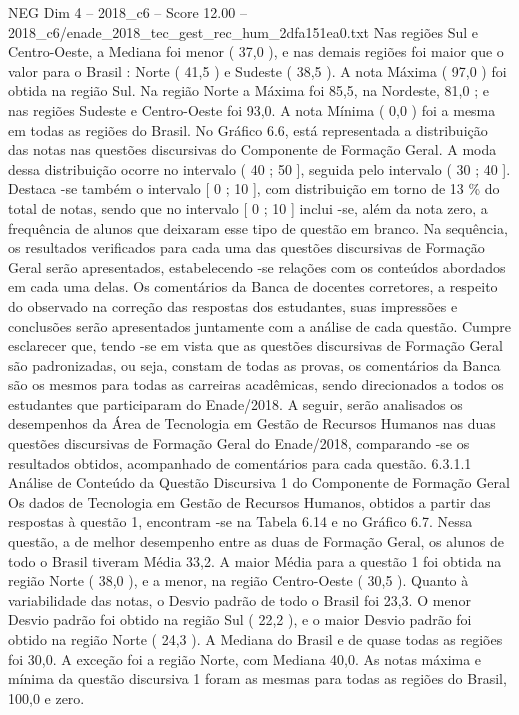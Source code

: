 \begin{textsample}{NEG Dim 4 – 2018\_c6 – Score 12.00 – 2018\_c6/enade\_2018\_tec\_gest\_rec\_hum\_2dfa151ea0.txt}
Nas regiões Sul e Centro-Oeste, a Mediana foi menor ( 37,0 ), e nas demais regiões foi maior que o valor para o Brasil : Norte ( 41,5 ) e Sudeste ( 38,5 ).
A nota Máxima ( 97,0 ) foi obtida na região Sul.
Na região Norte a Máxima foi 85,5, na Nordeste, 81,0 ; e nas regiões Sudeste e Centro-Oeste foi 93,0.
A nota Mínima ( 0,0 ) foi a mesma em todas as regiões do Brasil.
No Gráfico 6.6, está representada a distribuição das notas nas questões discursivas do Componente de Formação Geral.
A moda dessa distribuição ocorre no intervalo ( 40 ; 50 ], seguida pelo intervalo ( 30 ; 40 ].
Destaca -se também o intervalo [ 0 ; 10 ], com distribuição em torno de 13 \% do total de notas, sendo que no intervalo [ 0 ; 10 ] inclui -se, além da nota zero, a frequência de alunos que deixaram esse tipo de questão em branco.
Na sequência, os resultados verificados para cada uma das questões discursivas de Formação Geral serão apresentados, estabelecendo -se relações com os conteúdos abordados em cada uma delas.
Os comentários da Banca de docentes corretores, a respeito do observado na correção das respostas dos estudantes, suas impressões e conclusões serão apresentados juntamente com a análise de cada questão.
Cumpre esclarecer que, tendo -se em vista que as questões discursivas de Formação Geral são padronizadas, ou seja, constam de todas as provas, os comentários da Banca são os mesmos para todas as carreiras acadêmicas, sendo direcionados a todos os estudantes que participaram do Enade/2018.
A seguir, serão analisados os desempenhos da Área de Tecnologia em Gestão de Recursos Humanos nas duas questões discursivas de Formação Geral do Enade/2018, comparando -se os resultados obtidos, acompanhado de comentários para cada questão. 6.3.1.1 Análise de Conteúdo da Questão Discursiva 1 do Componente de Formação Geral Os dados de Tecnologia em Gestão de Recursos Humanos, obtidos a partir das respostas à questão 1, encontram -se na Tabela 6.14 e no Gráfico 6.7.
Nessa questão, a de melhor desempenho entre as duas de Formação Geral, os alunos de todo o Brasil tiveram Média 33,2.
A maior Média para a questão 1 foi obtida na região Norte ( 38,0 ), e a menor, na região Centro-Oeste ( 30,5 ).
Quanto à variabilidade das notas, o Desvio padrão de todo o Brasil foi 23,3.
O menor Desvio padrão foi obtido na região Sul ( 22,2 ), e o maior Desvio padrão foi obtido na região Norte ( 24,3 ).
A Mediana do Brasil e de quase todas as regiões foi 30,0.
A exceção foi a região Norte, com Mediana 40,0.
As notas máxima e mínima da questão discursiva 1 foram as mesmas para todas as regiões do Brasil, 100,0 e zero.

\end{textsample}
